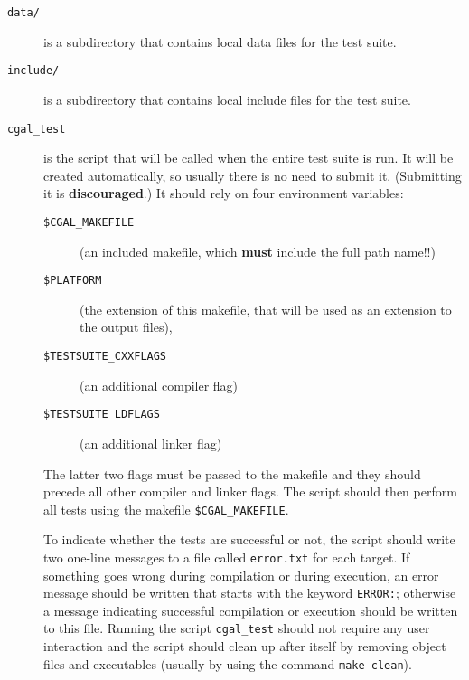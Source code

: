 \begin{description}
   \item[{\tt data/}] is a subdirectory that contains local data files for the
        test suite.
   \item[{\tt include/}] is a subdirectory that contains local include files for
        the test suite.
   \item[{\tt cgal\_test}]
        is the script that will be called when the entire
        test suite is run. It will be created automatically, so usually there
	is no need to submit it. (Submitting it is {\bf discouraged}.)
	It should rely on four environment variables:
        \begin{description}
            \item[{\tt \$CGAL\_MAKEFILE}]%
                 (an included makefile, which {\bf must} include the full path
                  name!!) 
            \item[{\tt \$PLATFORM}]%
                 (the extension of this makefile, that will 
                 be used as an extension to the output files), 
            \item[{\tt \$TESTSUITE\_CXXFLAGS}]%
                 (an additional compiler flag) 
            \item[{\tt \$TESTSUITE\_LDFLAGS}] 
                 (an additional linker flag) 
        \end{description}
        The latter two flags must be passed to the makefile%
        and they should 
        precede all other compiler and linker flags. The script should then
        perform all tests using the makefile \verb|$CGAL_MAKEFILE|. 

        To indicate whether the tests are successful or not, the script should 
        write two one-line messages to a file called {\tt error.txt}
        for each target. If something 
        goes wrong during compilation or during execution, an error message 
        should be written that starts with the keyword {\tt ERROR:}; otherwise
        a message indicating successful compilation or execution should be
        written to this file. Running the script {\tt cgal\_test} should not 
        require any user interaction and the script should clean up after 
        itself by removing object files and executables (usually by using the
        command {\tt make clean}).


\end{description}
